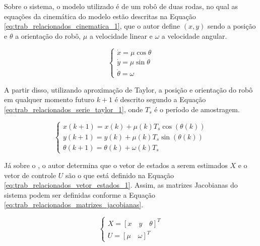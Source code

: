 \documentclass[acronym, symbols, table]{fei}
\begin{document}
	Sobre o sistema, o modelo utilizado é de um robô de duas rodas, no qual as equações da cinemática do modelo estão descritas na Equação \eqref{eq:trab_relacionados_cinematica_1}, que o autor define $(x, y)$ sendo a posição e $\theta$ a orientação do robô, $\mu$ a velocidade linear e $\omega$ a velocidade angular.
	
	\begin{equation}\label{eq:trab_relacionados_cinematica_1}
		\begin{cases}
			\dot{x} = \mu \cos{\theta} \\
			\dot{y} = \mu \sin{\theta} \\
			\dot{\theta} = \omega
		\end{cases}
	\end{equation}
	
	A partir disso, utilizando aproximação de Taylor, a posição e orientação do robô em qualquer momento futuro $k + 1$ é descrito segundo a Equação \eqref{eq:trab_relacionados_serie_taylor_1}, onde $T_s$ é o período de amostragem.
	
	\begin{equation} \label{eq:trab_relacionados_serie_taylor_1}
		\begin{cases*}
			x(k+1) = x(k) + \mu(k)T_s\cos{(\theta(k))} \\
			y(k+1) = y(k) + \mu(k)T_s\sin{(\theta(k))} \\
			\theta(k+1) = \theta(k) + \omega(k)T_s
		\end{cases*}
	\end{equation}
	
	Já sobre o , o autor determina que o vetor de estados a serem estimados $X$ e o vetor de controle $U$ são o que está definido na Equação \eqref{eq:trab_relacionados_vetor_estados_1}. Assim, as matrizes Jacobianas do sistema podem ser definidas conforme a Equação \eqref{eq:trab_relacionados_matrizes_jacobianas}.
	
	\begin{equation}\label{eq:trab_relacionados_vetor_estados_1}
		\begin{cases}
			X = [x \quad y \quad \theta]^T \\
			U = [\mu \quad \omega]^T
		\end{cases}
	\end{equation}
	
\end{document}
